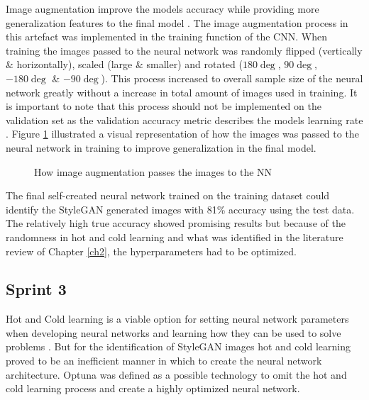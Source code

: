 Image augmentation improve the models accuracy while providing more generalization features to the final model \citep{Wang}. The image augmentation process in this artefact was implemented in the training function of the CNN. When training the images passed to the neural network was randomly flipped (vertically \& horizontally), scaled (large \& smaller) and rotated ($180\deg$, $90\deg$, $-180\deg$ \& $-90\deg$). This process increased to overall sample size of the neural network greatly without a increase in total amount of images used in training. It is important to note that this process should not be implemented on the validation set as the validation accuracy metric describes the models learning rate \citep{Wang}. Figure \ref{fig:faug} illustrated a visual representation of how the images was passed to the neural network in training to improve generalization in the final model.

\begin{figure}[H]%
\centering
{}%
\caption{How image augmentation passes the images to the NN}%
\label{fig:faug}%
\end{figure}

The final self-created neural network trained on the training dataset could identify the StyleGAN generated images with 81\% accuracy using the test data. The relatively high true accuracy showed promising results but because of the randomness in hot and cold learning and what was identified in the literature review of Chapter \ref{ch2}, the hyperparameters had to be optimized.


\subsection{Sprint 3}

Hot and Cold learning is a viable option for setting neural network parameters when developing neural networks and learning how they can be used to solve problems \citep{Trask2019}. But for the identification of StyleGAN images hot and cold learning proved to be an inefficient manner in which to create the neural network architecture. Optuna was defined as a possible technology to omit the hot and cold learning process and create a highly optimized neural network.  

